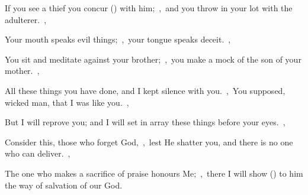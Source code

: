 \documentclass[12pt,twoside,a5paper]{article}
\begin{document}
\begin{normalparskip}
  If you see a thief you concur () with him;~\sep\ and you throw in your lot with the adulterer.~\sep

  Your mouth speaks evil things;~\sep\ your tongue speaks deceit.~\sep

  You sit and meditate against your brother;~\sep\ you make a mock of the son of your mother.~\sep

  All these things you have done, and I kept silence with you.~\sep\ You supposed, wicked man, that I was like you.~\sep

  But I will reprove you; and I will set in array these things before your eyes.~\sep

  Consider this, those who forget God,~\sep\ lest He shatter you, and there is no one who can deliver.~\sep

  The one who makes a sacrifice of praise honours Me;~\sep\ there I will show () to him the way of salvation of our God.
\end{normalparskip}

\end{document}
